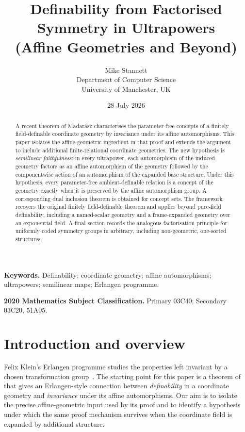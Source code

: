 \documentclass[11pt,a4paper]{article}
\title{Definability from Factorised Symmetry in Ultrapowers\\[2mm]
\large (Affine Geometries and Beyond)}
\author{Mike Stannett\\[2mm]
\small Department of Computer Science\\University of Manchester, UK}
\date{28 July 2026}
\theoremstyle{definition}
\begin{document}
\maketitle

\begin{abstract}
A recent theorem of Madar\'asz
characterises the parameter-free concepts of a finitely field-definable coordinate
geometry by invariance under its affine automorphisms. This paper isolates the
affine-geometric ingredient in that proof and extends the argument to include additional finite-relational
coordinate geometries. The new hypothesis is \emph{semilinear faithfulness}: in every
ultrapower, each automorphism of the induced geometry factors as an affine automorphism
of the geometry followed by the componentwise action of an automorphism of the expanded
base structure. Under this hypothesis, every parameter-free ambient-definable relation is
a concept of the geometry exactly when it is preserved by the affine automorphism group.
A corresponding dual inclusion theorem is obtained for concept sets. The framework
recovers the original finitely field-definable theorem and applies beyond pure-field
definability, including a named-scalar geometry and a frame-expanded geometry over an
exponential field. A final section records the analogous factorisation principle for
uniformly coded symmetry groups in arbitrary, including non-geometric, one-sorted structures.
\end{abstract}

\medskip
\noindent\textbf{Keywords.} Definability; coordinate geometry; affine automorphisms;
ultrapowers; semilinear maps; Erlangen programme.

\medskip
\noindent\textbf{2020 Mathematics Subject Classification.}
Primary 03C40; Secondary 03C20, 51A05.

\section{Introduction and overview}
\label{sec:1}

Felix Klein's Erlangen programme studies the properties left invariant by a chosen
transformation group~\cite[\S\S1--2]{Klein1872}.
The starting point for this paper is a theorem of \cite{MSS26}
that gives an Erlangen-style
connection between \emph{definability} in a coordinate geometry and
\emph{invariance} under its affine automorphisms. Our aim is to isolate the precise affine-geometric
input used by its proof and to identify a hypothesis under which the
same proof mechanism survives when the coordinate field is expanded by
additional structure.
\end{document}
